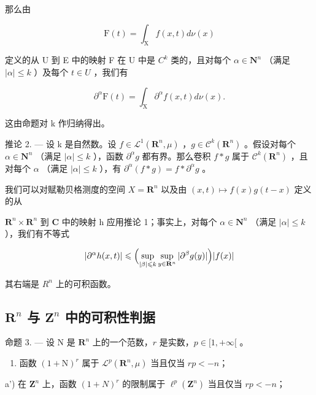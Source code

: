 那么由

\[
\mathrm{F} (t) = \int_ {\mathrm{X}} f (x, t) d \nu (x)
\]

定义的从 U 到 E 中的映射 F 在 U 中是 \(C^{k}\) 类的，且对每个 \(\alpha\in \mathbf{N}^{n}\) （满足 \(|\alpha|\leqslant k\) ）及每个 \(t\in U\) ，我们有

\[
\partial^ {\alpha} \mathrm{F} (t) = \int_ {\mathrm{X}} \partial^ {\alpha} f (x, t) d \nu (x).
\]

这由命题对 k 作归纳得出。

推论 2. --- 设 k 是自然数。设 \(f \in \mathcal{L}^1(\mathbf{R}^n, \mu)\) ，\(g \in \mathcal{C}^k(\mathbf{R}^n)\) 。假设对每个 \(\alpha \in \mathbf{N}^n\) （满足 \(|\alpha| \leqslant k\) ），函数 \(\partial^\alpha g\) 都有界。那么卷积 \(f * g\) 属于 \(\mathcal{C}^k(\mathbf{R}^n)\) ，且对每个 \(\alpha\) （满足 \(|\alpha| \leqslant k\) ），有 \(\partial^\alpha(f * g) = f * \partial^\alpha g\) 。

我们可以对赋勒贝格测度的空间 \(X = \mathbf{R}^{n}\) 以及由 \((x, t) \mapsto f(x)g(t - x)\) 定义的从

\(\mathbf{R}^{n} \times \mathbf{R}^{n}\) 到 \(\mathbf{C}\) 中的映射 h 应用推论 1；事实上，对每个 \(\alpha \in \mathbf{N}^{n}\) （满足 \(|\alpha| \leqslant k\) ），我们有不等式

\[
| \partial^ {\alpha} h (x, t) | \leqslant \Bigl (\sup _ {| \beta | \leqslant k} \sup _ {y \in \mathbf {R} ^ {n}} | \partial^ {\beta} g (y) | \Bigr) | f (x) |
\]

其右端是 \(R^{n}\) 上的可积函数。

\subsection{\texorpdfstring{\(\mathbf{R}^{n}\) 与 \(\mathbf{Z}^{n}\) 中的可积性判据}{\textbackslash mathbf\{R\}\^{}\{n\} 与 \textbackslash mathbf\{Z\}\^{}\{n\} 中的可积性判据}}

命题 3. --- 设 N 是 \(\mathbf{R}^{n}\) 上的一个范数，\(r\) 是实数，\(p \in [1, +\infty[\) 。

\begin{enumerate}
\def\labelenumi{\alph{enumi})}
\tightlist
\item
  函数 \((1 + \mathrm{N})^{r}\) 属于 \(\mathcal{L}^{p}(\mathbf{R}^{n}, \mu)\) 当且仅当 \(rp < -n\)；
\end{enumerate}

a') 在 \(\mathbf{Z}^{n}\) 上，函数 \((1+N)^{r}\) 的限制属于 \(\ell^{p}(\mathbf{Z}^{n})\) 当且仅当 \(rp < -n\)；

